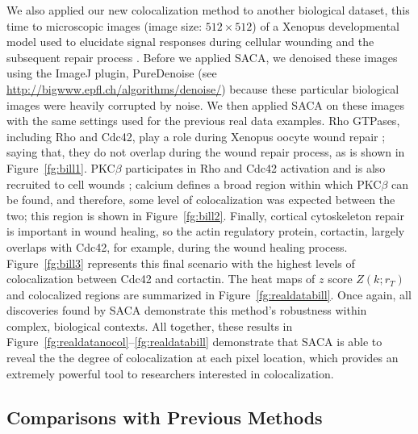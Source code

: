 \documentclass[10pt,twocolumn,twoside]{IEEEtran}
\begin{document}
We also applied our new colocalization method to another biological dataset, this time to microscopic images (image size: $512\times 512$) of a  Xenopus developmental model used to elucidate signal responses during cellular wounding and the subsequent repair process \citep[see][]{wang2017}. Before we applied SACA, we denoised these images using the ImageJ plugin, PureDenoise (see \url{http://bigwww.epfl.ch/algorithms/denoise/}) because these particular biological images were heavily corrupted by noise.  We then applied SACA on these images with the same settings used for the  previous real data examples. Rho GTPases, including Rho and Cdc42, play a role during Xenopus oocyte wound repair \citep[see][]{simon2013}; saying that, they do not overlap during the wound repair process, as is shown in Figure~\ref{fg:bill1}. PKC$\beta$ participates in Rho and Cdc42 activation and is also recruited to cell wounds \citep[see][]{vaughan2014}; calcium defines a broad region within which PKC$\beta$ can be found, and therefore, some level of colocalization was expected between the two; this region is shown in Figure~\ref{fg:bill2}. Finally, cortical cytoskeleton repair is important in wound healing, so the actin regulatory protein, cortactin, largely overlaps with Cdc42, for example, during the wound healing process. Figure~\ref{fg:bill3} represents this final scenario with the highest levels of colocalization between Cdc42 and cortactin.  The heat maps of $z$ score $Z(k;r_T)$ and colocalized regions are summarized in Figure~\ref{fg:realdatabill}. Once again, all discoveries found by SACA demonstrate this method's robustness within complex, biological contexts. All together, these results in Figure~\ref{fg:realdatanocol}--\ref{fg:realdatabill} demonstrate that SACA is able to reveal the the degree of colocalization at each pixel location, which provides an extremely powerful tool to researchers interested in colocalization.


\subsection{Comparisons with Previous Methods}
\end{document}
